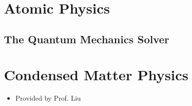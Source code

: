 \documentclass[11pt]{article}
\begin{document}
\section{Atomic Physics}
\label{sec:org289fa71}
\subsection{The Quantum Mechanics Solver}
\label{sec:org0c85a47}
\section{Condensed Matter Physics}
\label{sec:orgf0aef5e}
\begin{itemize}
\item Provided by Prof. Liu
\end{itemize}
\end{document}
